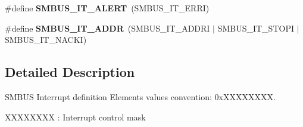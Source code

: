 \begin{DoxyCompactItemize}
\#define {\bfseries S\+M\+B\+U\+S\+\_\+\+I\+T\+\_\+\+A\+L\+E\+RT}~(S\+M\+B\+U\+S\+\_\+\+I\+T\+\_\+\+E\+R\+RI)
\item 
\mbox{\label{group___s_m_b_u_s___interrupt__configuration__definition_ga730a8c360daead4cf0e83283e6b0f007}} 
\#define {\bfseries S\+M\+B\+U\+S\+\_\+\+I\+T\+\_\+\+A\+D\+DR}~(S\+M\+B\+U\+S\+\_\+\+I\+T\+\_\+\+A\+D\+D\+RI $\vert$ S\+M\+B\+U\+S\+\_\+\+I\+T\+\_\+\+S\+T\+O\+PI $\vert$ S\+M\+B\+U\+S\+\_\+\+I\+T\+\_\+\+N\+A\+C\+KI)
\end{DoxyCompactItemize}


\subsection{Detailed Description}
S\+M\+B\+US Interrupt definition Elements values convention\+: 0x\+X\+X\+X\+X\+X\+X\+XX. 


\begin{DoxyItemize}
\item X\+X\+X\+X\+X\+X\+XX \+: Interrupt control mask 
\end{DoxyItemize}